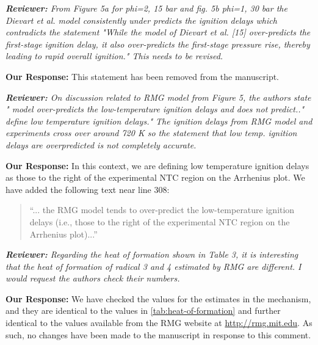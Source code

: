 \documentclass{article}
\newenvironment{reviewer}{\vspace{0.5\baselineskip}\begingroup\itshape\textbf{Reviewer:}}{\endgroup\vspace{0.5\baselineskip}}
\newenvironment{response}{\vspace{0.5\baselineskip}\textbf{Our Response:}}{\vspace{0.5\baselineskip}}
\begin{document}
\begin{reviewer}
    From Figure 5a for phi=2, 15 bar and  fig. 5b phi=1, 30 bar the  Dievart et al. model
    consistently under predicts the ignition delays which contradicts the statement "While the
    model of Dievart et al. [15] over-predicts the first-stage ignition delay, it also over-predicts
    the first-stage pressure rise, thereby leading  to rapid overall ignition." This needs to be
    revised.
\end{reviewer}

\begin{response}
    This statement has been removed from the manuscript.
\end{response}

\begin{reviewer}
    On discussion related to RMG model from Figure 5, the authors state " model over-predicts the
    low-temperature ignition delays and does not predict.." define low temperature ignition delays."
    The ignition delays from RMG model and experiments cross over around 720 K so the statement that
    low temp. ignition delays are overpredicted is not completely accurate.
\end{reviewer}

\begin{response}
    In this context, we are defining low temperature ignition delays as those to the right of the
    experimental NTC region on the Arrhenius plot. We have added the following text near line 308:

    \begin{quote}
        ``... the RMG model tends to over-predict the low-temperature ignition delays (i.e., those to the right of the experimental NTC region on the Arrhenius plot)...''
    \end{quote}
\end{response}

\begin{reviewer}
    Regarding the heat of formation shown in Table 3, it is interesting that the heat of formation
    of radical 3 and 4 estimated by RMG are different. I would request the authors check their
    numbers.
\end{reviewer}

\begin{response}
    We have checked the values for the estimates in the mechanism, and they are identical to the
    values in \cref{tab:heat-of-formation} and further identical to the values available from the
    RMG website at \url{http://rmg.mit.edu}. As such, no changes have been made to the manuscript in
    response to this comment.
\end{response}
\end{document}
